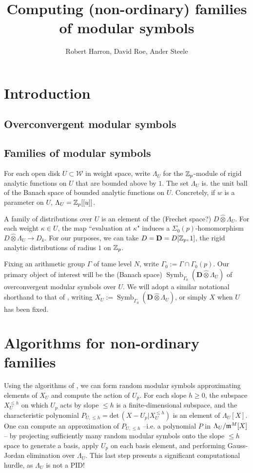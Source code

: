 \documentclass[12pt]{article}
\theoremstyle{definition}
\def\Z{{\Bbb Z}}
\def\det{\text{det}\,}
\def\Symb{\operatorname{Symb}}
\def\cW{\mathcal{W}}
\def\bD{\mathbf{D}}
\begin{document}
\title{Computing (non-ordinary) families of modular symbols}
\author{Robert Harron, David Roe, Ander Steele}


\maketitle
\section{Introduction}
\subsection{Overconvergent modular symbols}
\subsection{Families of modular symbols}
For each open disk $U\subset\cW$ in weight space, write $\Lambda_U$ for the $\Z_p$-module of rigid analytic functions on $U$ that are bounded above by $1$. The set $\Lambda_U$ is. the unit ball of the Banach space of bounded analytic functions on $U$. Concretely, if $w$ is a parameter on $U$, $\Lambda_U=\Z_p[[u]]$. 

A family of distributions over $U$ is an element of the (Frechet space?) $D\widehat{\otimes}\Lambda_U$. For each weight $\kappa\in U$, the map ``evaluation at $\kappa$" induces a $\Sigma_0(p)$-homomorphism $D\widehat{\otimes}\Lambda_U\rightarrow D_k$. For our purposes, we can take $D=\bD=D[\Z_p,1]$, the rigid analytic distributions of radius $1$ on $\Z_p$. 

Fixing an arithmetic group $\Gamma$ of tame level $N$, write $\Gamma_0:=\Gamma\cap\Gamma_0(p)$. Our primary object of interest will be the (Banach space) $\Symb_{\Gamma_0}(\bD\widehat{\otimes}\Lambda_U)$ of overconvergent modular symbols over $U$. We will adopt a similar notational shorthand to that of \cite{Robs}, writing $X_U:=\Symb_{\Gamma_0}(\bD\widehat{\otimes}\Lambda_U)$, or simply $X$ when $U$ has been fixed. 


\section{Algorithms for non-ordinary families}
Using the algorithms of \cite{Robs}, we can form random modular symbols approximating elements of $X_U$ and compute the action of $U_p$. For each slope $h\geq 0$, the subspace $X_U^{\leq h}$ on which $U_p$ acts by slope $\leq h$ is a finite-dimensional subspace, and the characteristic polynomial $P_{U,\leq h}=\det(X-U_p|X_U^{\leq h})$ is an element of $\Lambda_U[X]$. One can compute an approximation of $P_{U,\leq h}$ --i.e. a  polynomial $P$ in $\Lambda_U/\frak{m}^M[X]$-- by projecting sufficiently many random modular symbols onto the slope $\leq h$ space to generate a basis, apply $U_p$ on each basis element, and performing Gauss-Jordan elimination over $\Lambda_U$. This last step presents a significant computational hurdle, as $\Lambda_U$ is not a PID!
\end{document}
